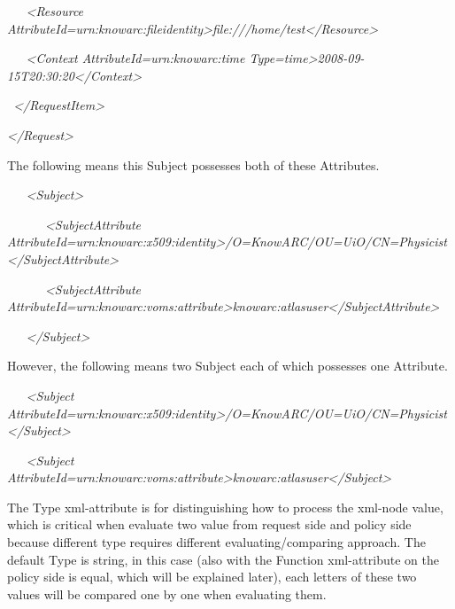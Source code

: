 \documentclass{article}
\begin{document}
{\color{black}
\textit{\ \ \ }\textit{{\textless}Resource
AttributeId={\textquotedbl}urn:knowarc:fileidentity{\textgreater}file:///home/test{\textless}/Resource{\textgreater}}}

{\color{black}
\textit{\ \ \ }\textit{{\textless}Context
AttributeId={\textquotedbl}urn:knowarc:time{\textquotedbl}
Type={\textquotedbl}time{\textquotedbl}{\textgreater}2008-09-15T20:30:20{\textless}/Context{\textgreater}}}

{\color{black}
\textit{\ }\textit{{\textless}/RequestItem{\textgreater}}}

{\itshape\color{black}
{\textless}/Request{\textgreater}}

{\upshape\color{black}
The following means this Subject possesses both of these Attributes.}

{\color{black}
\textit{\ \ \ }\textit{{\textless}Subject{\textgreater}}}

{\color{black}
\textit{\ \ \ \ \ \ }\textit{{\textless}SubjectAttribute
AttributeId={\textquotedbl}urn:knowarc:x509:identity{\textquotedbl}{\textgreater}/O=KnowARC/OU=UiO/CN=Physicist{\textless}/SubjectAttribute{\textgreater}}}

{\color{black}
\textit{\ \ \ \ \ \ }\textit{{\textless}SubjectAttribute
AttributeId={\textquotedbl}urn:knowarc:voms:attribute{\textgreater}knowarc:atlasuser{\textless}/SubjectAttribute{\textgreater}}}

{\color{black}
\textit{\ \ \ }\textit{{\textless}/Subject{\textgreater}}}

{\color{black}
However, the following means two Subject each of which possesses one
Attribute.}

{\color{black}
\textit{\ \ \ }\textit{{\textless}Subject
AttributeId={\textquotedbl}urn:knowarc:x509:identity{\textquotedbl}{\textgreater}/O=KnowARC/OU=UiO/CN=Physicist{\textless}/Subject{\textgreater}}}

{\color{black}
\textit{\ \ \ }\textit{{\textless}Subject
AttributeId={\textquotedbl}urn:knowarc:voms:attribute{\textgreater}knowarc:atlasuser{\textless}/Subject{\textgreater}}}

{\color{black}
The {\textquotedbl}Type{\textquotedbl} xml-attribute is for
distinguishing how to process the xml-node value, which is critical
when evaluate two value from request side and policy side because
different type requires different evaluating/comparing approach. The
default {\textquotedbl}Type{\textquotedbl} is
{\textquotedbl}string{\textquotedbl}, in this case (also with the
{\textquotedbl}Function{\textquotedbl} xml-attribute on the policy side
is {\textquotedbl}equal{\textquotedbl}, which will be explained later),
each letters of these two values will be compared one by one when
evaluating them.}
\end{document}
